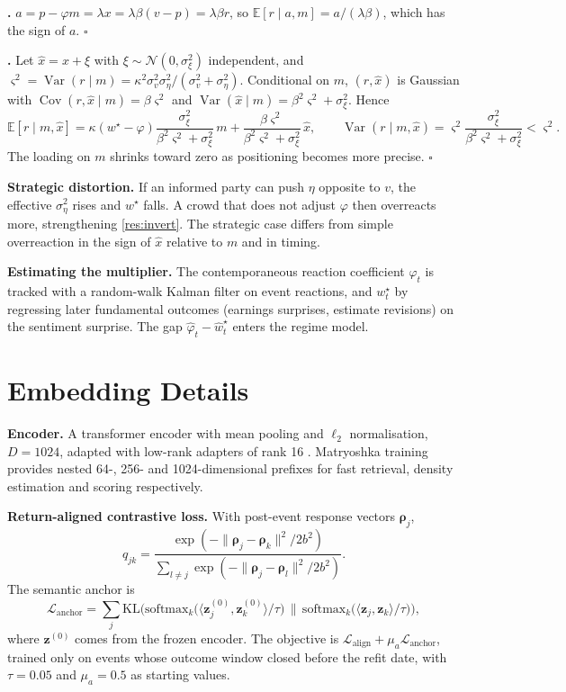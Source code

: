 \documentclass[11pt,a4paper]{article}
\theoremstyle{plain}
\theoremstyle{definition}
\newcommand{\E}{\mathbb{E}}
\newcommand{\N}{\mathcal{N}}
\newcommand{\z}{\bm{z}}
\DeclareMathOperator{\Var}{Var}
\DeclareMathOperator{\Cov}{Cov}
\begin{document}
\textbf{.} $a=p-\varphi m=\lambda x=\lambda\beta(v-p)=\lambda\beta r$, so $\E[r\mid a,m]=a/(\lambda\beta)$, which has the sign of $a$. \hfill$\square$

\textbf{.} Let $\hat x=x+\xi$ with $\xi\sim\N(0,\sigma_\xi^2)$ independent, and $\varsigma^2=\Var(r\mid m)=\kappa^2\sigma_v^2\sigma_\eta^2/(\sigma_v^2+\sigma_\eta^2)$. Conditional on $m$, $(r,\hat x)$ is Gaussian with $\Cov(r,\hat x\mid m)=\beta\varsigma^2$ and $\Var(\hat x\mid m)=\beta^2\varsigma^2+\sigma_\xi^2$. Hence
\[
\E[r\mid m,\hat x]=\kappa(w^\star-\varphi)\frac{\sigma_\xi^2}{\beta^2\varsigma^2+\sigma_\xi^2}\,m+\frac{\beta\varsigma^2}{\beta^2\varsigma^2+\sigma_\xi^2}\,\hat x,
\qquad
\Var(r\mid m,\hat x)=\varsigma^2\frac{\sigma_\xi^2}{\beta^2\varsigma^2+\sigma_\xi^2}<\varsigma^2 .
\]
The loading on $m$ shrinks toward zero as positioning becomes more precise. \hfill$\square$

\textbf{Strategic distortion.} If an informed party can push $\eta$ opposite to $v$, the effective $\sigma_\eta^2$ rises and $w^\star$ falls. A crowd that does not adjust $\varphi$ then overreacts more, strengthening \cref{res:invert}. The strategic case differs from simple overreaction in the sign of $\hat x$ relative to $m$ and in timing.

\textbf{Estimating the multiplier.} The contemporaneous reaction coefficient $\varphi_t$ is tracked with a random-walk Kalman filter on event reactions, and $w^\star_t$ by regressing later fundamental outcomes (earnings surprises, estimate revisions) on the sentiment surprise. The gap $\hat\varphi_t-\hat w^\star_t$ enters the regime model.

\section{Embedding Details}\label{app:embeddings}

\textbf{Encoder.} A transformer encoder \citep{vaswani2017,reimers2019,wang2022e5} with mean pooling and $\ell_2$ normalisation, $D=1024$, adapted with low-rank adapters of rank 16 \citep{hu2022}. Matryoshka training \citep{kusupati2022} provides nested 64-, 256- and 1024-dimensional prefixes for fast retrieval, density estimation and scoring respectively.

\textbf{Return-aligned contrastive loss.} With post-event response vectors $\bm\rho_j$,
\[
q_{jk}=\frac{\exp(-\|\bm\rho_j-\bm\rho_k\|^2/2b^2)}{\sum_{l\neq j}\exp(-\|\bm\rho_j-\bm\rho_l\|^2/2b^2)} .
\]
The semantic anchor is
\[
\mathcal{L}_{\text{anchor}}=\sum_j\mathrm{KL}\Big(\mathrm{softmax}_k\big(\langle\z^{(0)}_j,\z^{(0)}_k\rangle/\tau\big)\,\Big\|\,\mathrm{softmax}_k\big(\langle\z_j,\z_k\rangle/\tau\big)\Big),
\]
where $\z^{(0)}$ comes from the frozen encoder. The objective is $\mathcal{L}_{\text{align}}+\mu_a\mathcal{L}_{\text{anchor}}$, trained only on events whose outcome window closed before the refit date, with $\tau=0.05$ and $\mu_a=0.5$ as starting values.
\end{document}
